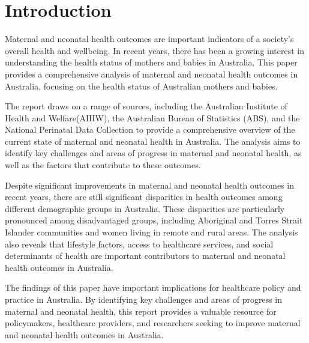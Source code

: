 

\section{Introduction}
Maternal and neonatal health outcomes are important indicators of a society's overall health and wellbeing. In recent years, there has been a growing interest in understanding the health status of mothers and babies in Australia. This paper provides a comprehensive analysis of maternal and neonatal health outcomes in Australia, focusing on the health status of Australian mothers and babies.

The report draws on a range of sources, including the Australian Institute of Health and Welfare(AIHW), the Australian Bureau of Statistics (ABS), and the National Perinatal Data Collection to provide a comprehensive overview of the current state of maternal and neonatal health in Australia. The analysis aims to identify key challenges and areas of progress in maternal and neonatal health, as well as the factors that contribute to these outcomes.

Despite significant improvements in maternal and neonatal health outcomes in recent years, there are still significant disparities in health outcomes among different demographic groups in Australia. These disparities are particularly pronounced among disadvantaged groups, including Aboriginal and Torres Strait Islander communities and women living in remote and rural areas. The analysis also reveals that lifestyle factors, access to healthcare services, and social determinants of health are important contributors to maternal and neonatal health outcomes in Australia.

The findings of this paper have important implications for healthcare policy and practice in Australia. By identifying key challenges and areas of progress in maternal and neonatal health, this report provides a valuable resource for policymakers, healthcare providers, and researchers seeking to improve maternal and neonatal health outcomes in Australia. 
